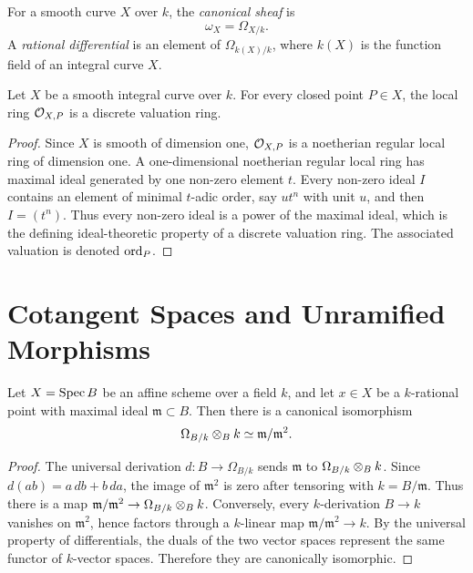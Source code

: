 \begin{definition}
For a smooth curve \(X\) over \(k\), the \emph{canonical sheaf} is
\[
    \omega_X=\Omega_{X/k}.
\]
A \emph{rational differential} is an element of
\(\Omega_{k(X)/k}\), where \(k(X)\) is the function field of an integral curve
\(X\).
\end{definition}

\begin{proposition}
Let \(X\) be a smooth integral curve over \(k\).  For every closed point
\(P\in X\), the local ring \(\mathcal{O}_{X,P}\) is a discrete valuation ring.
\end{proposition}

\begin{proof}
Since \(X\) is smooth of dimension one, \(\mathcal{O}_{X,P}\) is a noetherian regular
local ring of dimension one.  A one-dimensional noetherian regular local ring
has maximal ideal generated by one non-zero element \(t\).  Every non-zero
ideal \(I\) contains an element of minimal \(t\)-adic order, say \(u t^n\) with
unit \(u\), and then \(I=(t^n)\).  Thus every non-zero ideal is a power of the
maximal ideal, which is the defining ideal-theoretic property of a discrete
valuation ring.  The associated valuation is denoted \(\operatorname{ord}_P\).
\end{proof}

\section{Cotangent Spaces and Unramified Morphisms}

\begin{proposition}
Let \(X=\operatorname{Spec} B\) be an affine scheme over a field \(k\), and let \(x\in X\) be
a \(k\)-rational point with maximal ideal \(\mathfrak m\subset B\).  Then there
is a canonical isomorphism
\[
    \Omega_{B/k}\otimes_B k\simeq \mathfrak m/\mathfrak m^2.
\]
\end{proposition}

\begin{proof}
The universal derivation \(d:B\to\Omega_{B/k}\) sends \(\mathfrak m\) to
\(\Omega_{B/k}\otimes_B k\).  Since \(d(ab)=a\,db+b\,da\), the image of
\(\mathfrak m^2\) is zero after tensoring with \(k=B/\mathfrak m\).  Thus there
is a map \(\mathfrak m/\mathfrak m^2\to\Omega_{B/k}\otimes_B k\).  Conversely,
every \(k\)-derivation \(B\to k\) vanishes on \(\mathfrak m^2\), hence factors
through a \(k\)-linear map \(\mathfrak m/\mathfrak m^2\to k\).  By the universal
property of differentials, the duals of the two vector spaces represent the
same functor of \(k\)-vector spaces.  Therefore they are canonically
isomorphic.
\end{proof}

